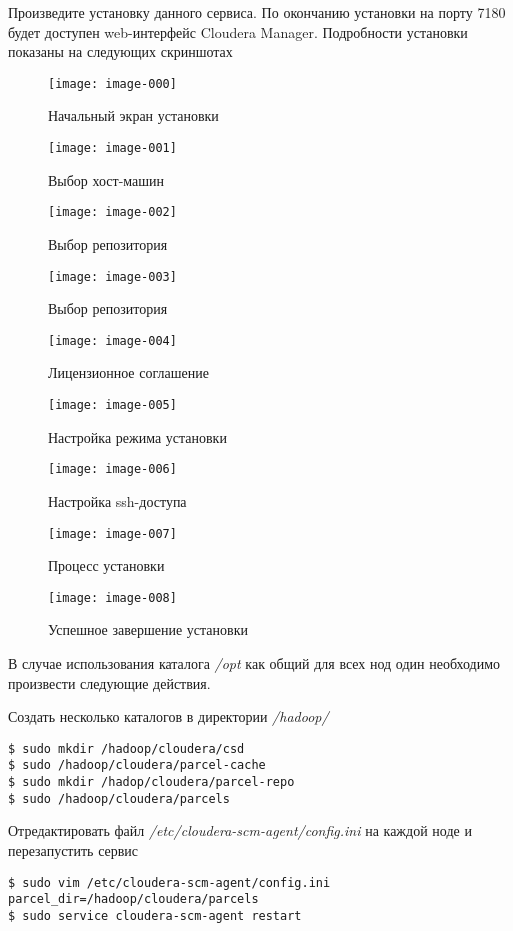 Произведите установку данного сервиса. По окончанию установки на порту 7180 будет доступен web-интерфейс 
Cloudera Manager. Подробности установки показаны на следующих скриншотах

\begin{figure}[ht!]
    \center
    \texttt{[image: image-000]}
    \caption{Начальный экран установки}
\end{figure}

\newpage

\begin{figure}[ht!]
    \center
    \texttt{[image: image-001]}
    \caption{Выбор хост-машин}
    \texttt{[image: image-002]}
    \caption{Выбор репозитория}
\end{figure}

\newpage

\begin{figure}[ht!]
    \center
    \texttt{[image: image-003]}
    \caption{Выбор репозитория}
    \texttt{[image: image-004]}
    \caption{Лицензионное соглашение}
\end{figure}

\newpage

\begin{figure}[ht!]
    \center
    \texttt{[image: image-005]}
    \caption{Настройка режима установки}
    \texttt{[image: image-006]}
    \caption{Настройка ssh-доступа}
\end{figure}

\newpage

\begin{figure}[ht!]
    \center
    \texttt{[image: image-007]}
    \caption{Процесс установки}
    \texttt{[image: image-008]}
    \caption{Успешное завершение установки}
\end{figure}

В случае использования каталога \emph{/opt} как общий для всех нод один необходимо произвести 
следующие действия.

Создать несколько каталогов в директории \emph{/hadoop/}
\begin{lstlisting}
$ sudo mkdir /hadoop/cloudera/csd
$ sudo /hadoop/cloudera/parcel-cache
$ sudo mkdir /hadop/cloudera/parcel-repo
$ sudo /hadoop/cloudera/parcels
\end{lstlisting}
Отредактировать файл \emph{/etc/cloudera-scm-agent/config.ini}\cite{parcels} на каждой ноде и 
перезапустить сервис
\begin{lstlisting}
$ sudo vim /etc/cloudera-scm-agent/config.ini
parcel_dir=/hadoop/cloudera/parcels
$ sudo service cloudera-scm-agent restart
\end{lstlisting}

